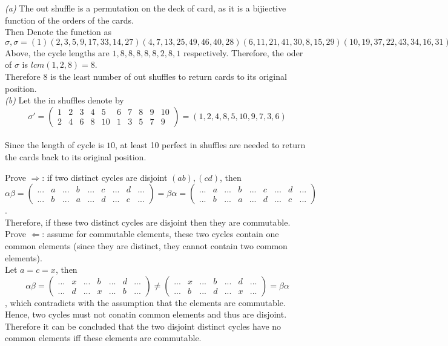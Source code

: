 \documentclass[11pt]{article}
\newenvironment{problem}[2][Problem]{\begin{trivlist}
\item[\hskip \labelsep {\bfseries #1}\hskip \labelsep {\bfseries #2.}]}{\end{trivlist}}
\begin{document}
\begin{problem}{(4)}
\textit{(a)} The out shuffle is a permutation on the deck of card, as it is a bijiective function of the orders of the cards.\\
Then Denote the function as $\sigma, \sigma = (1)(2,3,5,9,17,33,14,27)(4,7,13,25,49,46,40,28)(6,11,21,41,30,8,15,29)(10,19,37,22,43,34,16,31)(12,23,45,38,24,47,42,32)
(18,35)(20,39,26,51,50,48,44,36)(52)$\\
Above, the cycle lengths are $1,8,8,8,8,8,2,8,1$ respectively. Therefore, the oder of $\sigma$ is $lcm (1,2,8) = 8$.\\
Therefore $8$ is the least number of out shuffles to return cards to its original position.\\
\textit{(b)} Let the in shuffles denote by \[ \sigma ' = \begin{pmatrix} 1&2&3&4&5&6&7&8&9&10\\ 2&4&6&8&10&1&3&5&7&9 \end{pmatrix} = (1,2,4,8,5,10,9,7,3,6)\]\\
Since the length of cycle is $10$, at least 10 perfect in shuffles are needed to return the cards back to its original position.\\
\end{problem}

\begin{problem}{(5)}
Prove $\Rightarrow$: if two distinct cycles are disjoint $(ab),(cd)$, then \[ \alpha \beta = \begin{pmatrix} ...&a&...&b&...&c&...&d&...\\...&b&...&a&...&d&...&c&... \end{pmatrix}=
\beta \alpha = \begin{pmatrix} ...&a&...&b&...&c&...&d&...\\...&b&...&a&...&d&...&c&... \end{pmatrix}\].\\
Therefore, if these two distinct cycles are disjoint then they are commutable.\\
Prove $\Leftarrow$: assume for commutable elements, these two cycles contain one common elements (since they are distinct, they cannot contain two common elements).\\
Let $a = c = x$, then \[ \alpha \beta = \begin{pmatrix} ...&x&...&b&...&d&...\\...&d&...&x&...&b&... \end{pmatrix} \neq 
\begin{pmatrix} ...&x&...&b&...&d&...\\...&b&...&d&...&x&... \end{pmatrix} = \beta \alpha \], which contradicts with the assumption that the elements are commutable.\\
Hence, two cycles must not conatin common elements and thus are disjoint.\\
Therefore it can be concluded that the two disjoint distinct cycles have no common elements iff these elements are commutable.\\

\end{problem}
\end{document}

